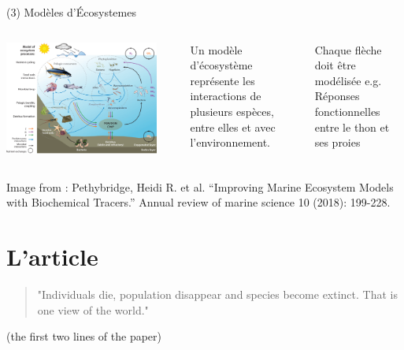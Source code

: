 \documentclass[11,aspectratio=1610]{beamer}
\begin{document}
\begin{frame}{(3) Modèles d'Écosystemes  }


\begin{columns}
\includegraphics[width=0.9\textwidth]{img/ecosystem_model.png}
\scriptsize{
Un  \alert{modèle d'écosystème } représente les interactions de plusieurs espèces, entre elles et avec l'environnement.


\vspace{0.5cm}
  \alert{Chaque flèche }  doit être modélisée  e.g. Réponses fonctionnelles entre le thon et ses proies 
}
\end{columns}



\vfill
\tiny{Image from :  Pethybridge, Heidi R. et al. “Improving Marine Ecosystem Models with Biochemical Tracers.” Annual review of marine science 10 (2018): 199-228.}

\end{frame}





\section{L'article}

\begin{frame}[standout]

\begin{quote}
"Individuals die, population disappear and species become extinct. That is one view of the world."
\end{quote}
\flushright
\tiny{(the first two lines of the paper)}
  
\end{frame}
\end{document}
